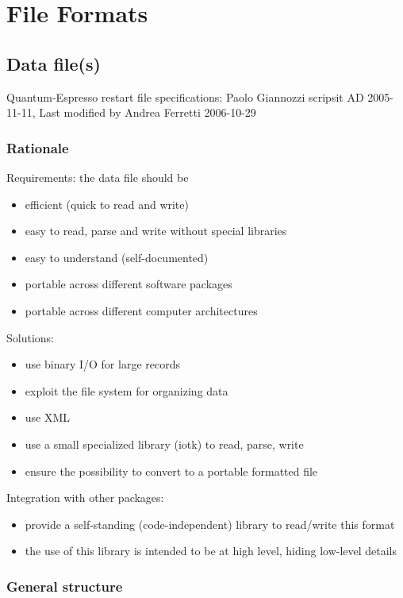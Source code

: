\documentclass[12pt,a4paper]{article}
\begin{document}
\section{ File Formats}
\subsection{Data file(s)}

Quantum-Espresso restart file specifications:
Paolo Giannozzi scripsit AD 2005-11-11,
Last modified by Andrea Ferretti 2006-10-29

\subsubsection{Rationale}

Requirements: the data file should be
\begin{itemize}
\item efficient (quick to read and write)
\item easy to read, parse and write without special libraries
\item easy to understand (self-documented)
\item portable across different software packages
\item portable across different computer architectures 
\end{itemize}
Solutions:
\begin{itemize}
\item use binary I/O for large records
\item exploit the file system for organizing data
\item use XML
\item use a small specialized library (iotk) to read, parse, write 
\item ensure the possibility to convert to a portable formatted file
\end{itemize}
Integration with other packages:
\begin{itemize}
\item provide a self-standing (code-independent) library to read/write this format
\item the use of this library is intended to be at high level, hiding low-level details
\end{itemize}

\subsubsection{General structure}
\end{document}
